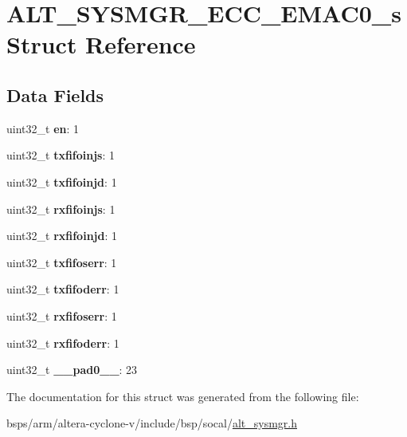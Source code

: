 \hypertarget{structALT__SYSMGR__ECC__EMAC0__s}{}\section{A\+L\+T\+\_\+\+S\+Y\+S\+M\+G\+R\+\_\+\+E\+C\+C\+\_\+\+E\+M\+A\+C0\+\_\+s Struct Reference}
\label{structALT__SYSMGR__ECC__EMAC0__s}
\subsection*{Data Fields}
\begin{DoxyCompactItemize}
\item 
\mbox{\label{structALT__SYSMGR__ECC__EMAC0__s_a355b3ce7c8760e7da211c1036b317a1a}} 
uint32\+\_\+t {\bfseries en}\+: 1
\item 
\mbox{\label{structALT__SYSMGR__ECC__EMAC0__s_af4323fd5200a9a6d29780912b445f2a5}} 
uint32\+\_\+t {\bfseries txfifoinjs}\+: 1
\item 
\mbox{\label{structALT__SYSMGR__ECC__EMAC0__s_a81e466cf248bbb9224bad98eee7c597b}} 
uint32\+\_\+t {\bfseries txfifoinjd}\+: 1
\item 
\mbox{\label{structALT__SYSMGR__ECC__EMAC0__s_a1536d6cfe04d5badd916c9ddf26551d6}} 
uint32\+\_\+t {\bfseries rxfifoinjs}\+: 1
\item 
\mbox{\label{structALT__SYSMGR__ECC__EMAC0__s_a9d9148453d6441d19242c0f43b717d86}} 
uint32\+\_\+t {\bfseries rxfifoinjd}\+: 1
\item 
\mbox{\label{structALT__SYSMGR__ECC__EMAC0__s_ac2ec89d67ba1cb89ad63779d92037db8}} 
uint32\+\_\+t {\bfseries txfifoserr}\+: 1
\item 
\mbox{\label{structALT__SYSMGR__ECC__EMAC0__s_add4b38295f14ae221cbef0699bb84454}} 
uint32\+\_\+t {\bfseries txfifoderr}\+: 1
\item 
\mbox{\label{structALT__SYSMGR__ECC__EMAC0__s_a1bff9295d7ab0bbe00fcceb28525203d}} 
uint32\+\_\+t {\bfseries rxfifoserr}\+: 1
\item 
\mbox{\label{structALT__SYSMGR__ECC__EMAC0__s_acd82bad647feab35eac4b13d4c3287e2}} 
uint32\+\_\+t {\bfseries rxfifoderr}\+: 1
\item 
\mbox{\label{structALT__SYSMGR__ECC__EMAC0__s_a862dc447508cc08dfcd5c761c0584ee1}} 
uint32\+\_\+t {\bfseries \+\_\+\+\_\+pad0\+\_\+\+\_\+}\+: 23
\end{DoxyCompactItemize}


The documentation for this struct was generated from the following file\+:\begin{DoxyCompactItemize}
\item 
bsps/arm/altera-\/cyclone-\/v/include/bsp/socal/\mbox{\hyperlink{alt__sysmgr_8h}{alt\+\_\+sysmgr.\+h}}\end{DoxyCompactItemize}
